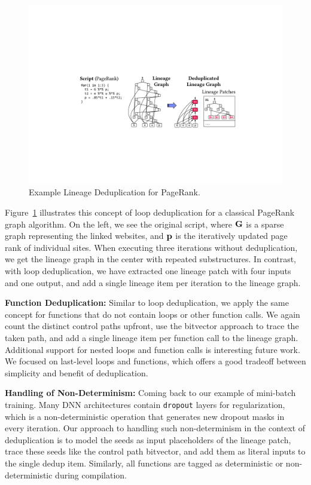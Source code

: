 \begin{figure}[!t]
	\centering
	\includegraphics[scale=0.32]{figures/dedup}
	\vspace{-0.25cm}
	\caption{\label{fig:dedup}Example Lineage Deduplication for PageRank.}
\end{figure}

\begin{example} Figure~\ref{fig:dedup} illustrates this concept of loop deduplication for a classical PageRank graph algorithm. On the left, we see the original script, where $\mathbf{G}$ is a sparse graph representing the linked websites, and $\mathbf{p}$ is the iteratively updated page rank of individual sites. When executing three iterations without deduplication, we get the lineage graph in the center with repeated substructures. In contrast, with loop deduplication, we have extracted one lineage patch with four inputs and one output, and add a single lineage item per iteration to the lineage graph.
\end{example}

\textbf{Function Deduplication:} Similar to loop deduplication, we apply the same concept for functions that do not contain loops or other function calls. We again count the distinct control paths upfront, use the bitvector approach to trace the taken path, and add a single lineage item per function call to the lineage graph. Additional support for nested loops and function calls is interesting future work. We focused on last-level loops and functions, which offers a good tradeoff between simplicity and benefit of deduplication.

\textbf{Handling of Non-Determinism:} Coming back to our example of mini-batch training. Many DNN architectures contain \texttt{dropout} layers for regularization, which is a non-deterministic operation that generates new dropout masks in every iteration. Our approach to handling such non-determinism in the context of deduplication is to model the seeds as input placeholders of the lineage patch, trace these seeds like the control path bitvector, and add them as literal inputs to the single dedup item. Similarly, all functions are tagged as deterministic or non-deterministic during compilation.

